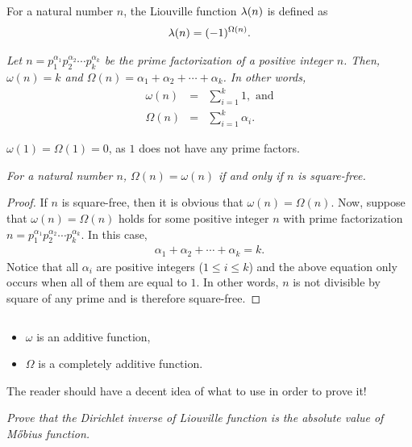 \documentclass[12pt]{subfile}
\begin{document}
	\begin{definition}
		For a natural number $n$, the Liouville function $\lambda (n)$ is defined as
		\begin{align*}
			\lambda (n) =  (-1)^{\Omega(n)}.
		\end{align*}
	\end{definition}
	
		\begin{proposition}\slshape
			Let $n= p_1^{\alpha_1} p_2^{\alpha_2} \cdots p_k^{\alpha_k}$ be the prime factorization of a positive integer $n$. Then, $\omega(n)=k$ and $\Omega(n)=\alpha_1 + \alpha_2 + \cdots + \alpha_k$. In other words, 
				\begin{eqnarray*}
					\omega(n) & = & \sum_{i=1}^{k} 1, \text{ and}\\
					\Omega(n) & = & \sum_{i=1}^{k} \alpha_i.
				\end{eqnarray*}
		\end{proposition}
		
		\begin{note}
			$\omega(1) = \Omega(1)=0$, as $1$ does not have any prime factors.
		\end{note}
		
		
		
		\begin{proposition}\slshape
			For a natural number $n$, $\Omega(n)=\omega(n)$ if and only if $n$ is square-free.
		\end{proposition}
		
		\begin{proof}
			If $n$ is square-free, then it is obvious that $\omega(n)=\Omega(n)$. Now, suppose that $\omega(n)=\Omega(n)$ holds for some positive integer $n$ with prime factorization $n= p_1^{\alpha_1} p_2^{\alpha_2} \cdots p_k^{\alpha_k}$. In this case,
				\begin{align*}
					\alpha_1 + \alpha_2 + \cdots + \alpha_k = k.
				\end{align*}
			Notice that all $\alpha_i$ are positive integers ($1 \leq i \leq k$) and the above equation only occurs when all of them are equal to $1$. In other words, $n$ is not divisible by square of any prime and is therefore square-free.
		\end{proof}
		
		\begin{proposition}\slshape\label{prop:additiveomega}
			$ $
			\begin{itemize}
				\item $\omega$ is an additive function,
				\item $\Omega$ is a completely additive function.
			\end{itemize}
		\end{proposition}	
	The reader should have a decent idea of what to use in order to prove it!
		\begin{theorem}\slshape
			Prove that the Dirichlet inverse of Liouville function is the absolute value of M\H obius function.
		\end{theorem}
		
\end{document}

